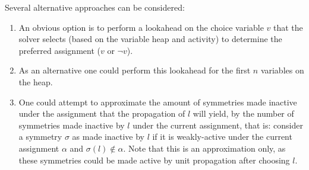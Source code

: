 	Several alternative approaches can be considered:

	\begin{enumerate}
		\item An obvious option is to perform a lookahead on the choice variable $v$ that the solver
			selects (based on the variable heap and activity) to determine the
			preferred assignment ($v$ or $\neg v$).

		\item As an alternative one could perform this lookahead for the first $n$ variables on the
			heap.

		\item One could attempt to approximate the amount of symmetries made inactive under the
			assignment that the propagation of $l$ will yield, by the number of symmetries made
			inactive by $l$ under the current assignment, that is: consider a symmetry $\sigma$ as
			made inactive by $l$ if it is weakly-active under the current assignment $\alpha$ and
			$\sigma(l) \notin \alpha$.
			Note that this is an approximation only, as these symmetries could be made active by
			unit propagation after choosing $l$.

	\end{enumerate}
